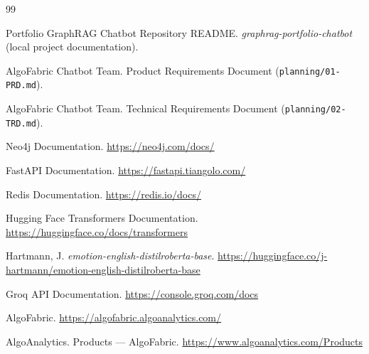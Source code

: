 \documentclass[12pt,a4paper]{report}
\begin{document}
\begin{thebibliography}{99}

Portfolio GraphRAG Chatbot Repository README.
\textit{graphrag-portfolio-chatbot} (local project documentation).

AlgoFabric Chatbot Team.
Product Requirements Document (\texttt{planning/01-PRD.md}).

AlgoFabric Chatbot Team.
Technical Requirements Document (\texttt{planning/02-TRD.md}).

Neo4j Documentation.
\url{https://neo4j.com/docs/}

FastAPI Documentation.
\url{https://fastapi.tiangolo.com/}

Redis Documentation.
\url{https://redis.io/docs/}

Hugging Face Transformers Documentation.
\url{https://huggingface.co/docs/transformers}

Hartmann, J.
\textit{emotion-english-distilroberta-base}.
\url{https://huggingface.co/j-hartmann/emotion-english-distilroberta-base}

Groq API Documentation.
\url{https://console.groq.com/docs}

AlgoFabric.
\url{https://algofabric.algoanalytics.com/}

AlgoAnalytics.
Products --- AlgoFabric.
\url{https://www.algoanalytics.com/Products}

\end{thebibliography}
\end{document}
